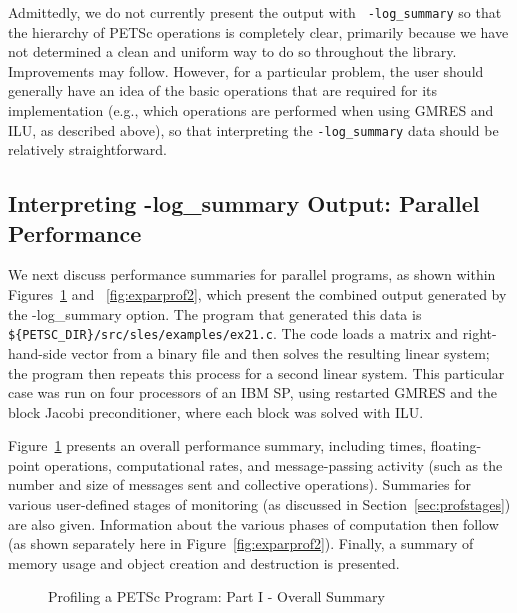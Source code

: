 Admittedly, we do not currently present the output with {\tt
-log\_summary} so that the hierarchy of PETSc operations is completely
clear, primarily because we have not determined a clean and uniform
way to do so throughout the library.  Improvements may follow.
However, for a particular problem, the user should generally have
an idea of the basic operations that are required for its
implementation (e.g., which operations are performed when using GMRES
and ILU, as described above), so that interpreting the {\tt -log\_summary}
data should be relatively straightforward.

\subsection{Interpreting -log\_summary Output: Parallel Performance}
\label{sec:parperformance}

We next discuss performance summaries for parallel programs,
 as shown within Figures~\ref{fig:exparprof} and
~\ref{fig:exparprof2}, which present the combined output generated by
the {-log\_summary} option.  The program that generated this data is
{\tt \$\{PETSC\_DIR\}/src/sles/examples/ex21.c}.  The code loads a
matrix and right-hand-side vector from a binary file and then solves
the resulting linear system; the program then repeats this process for
a second linear system.  This particular case was run on four
processors of an IBM SP, using restarted GMRES and the block Jacobi
preconditioner, where each block was solved with ILU.

Figure~\ref{fig:exparprof} presents an overall performance summary,
including times, floating-point operations, computational rates, and
message-passing activity (such as the number and size of messages sent
and collective operations).  Summaries for various user-defined stages
of monitoring (as discussed in Section~\ref{sec:profstages}) are also
given. Information about the various phases of computation then follow
(as shown separately here in Figure~\ref{fig:exparprof2}).
Finally, a summary of memory usage and object creation and destruction
is presented.

\begin{figure}[tb]
\centerline{}
\vspace{-2.5in}
\caption{Profiling a PETSc Program: Part I - Overall Summary}
\label{fig:exparprof}
\end{figure}

